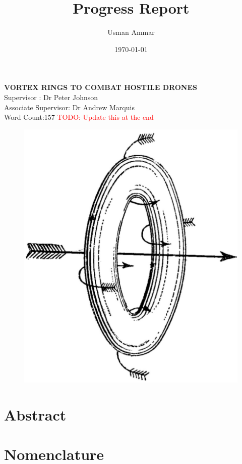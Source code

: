 \documentclass[a4paper,12pt]{article}
\title{\Huge{Progress Report}}
\author{Usman Ammar }
\date{\today}
\begin{document}
\maketitle
\vspace{-13mm}
\hrulefill 

\begin{center}
   
    \large\textbf{VORTEX RINGS TO COMBAT HOSTILE DRONES} \\
    Supervisor : Dr Peter Johnson \\
    Associate Supervisor: Dr Andrew Marquis \\
    Word Count:157 \textcolor{red}{TODO: Update this at the end }
\end{center}
 \begin{figure}[h!]
     \centering
     \includegraphics[width=0.7\linewidth]{vortex_titlepage.jpg}
     \caption{\cite{Helmholtz1858}}
     \label{fig:my_label}
 \end{figure}
\newpage
\section*{Abstract}
\newpage
\section*{Nomenclature}

\newpage
\end{document}
